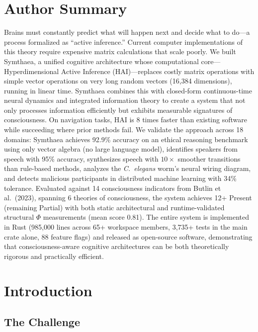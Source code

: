 \documentclass[10pt,letterpaper]{article}
\renewcommand{\Phi}{\varPhi}
\begin{document}
\section*{Author Summary}
Brains must constantly predict what will happen next and decide what to do---a process formalized as ``active inference.'' Current computer implementations of this theory require expensive matrix calculations that scale poorly. We built Symthaea, a unified cognitive architecture whose computational core---Hyperdimensional Active Inference (HAI)---replaces costly matrix operations with simple vector operations on very long random vectors (16,384 dimensions), running in linear time. Symthaea combines this with closed-form continuous-time neural dynamics and integrated information theory to create a system that not only processes information efficiently but exhibits measurable signatures of consciousness. On navigation tasks, HAI is 8 times faster than existing software while succeeding where prior methods fail. We validate the approach across 18 domains: Symthaea achieves 92.9\% accuracy on an ethical reasoning benchmark using only vector algebra (no large language model), identifies speakers from speech with 95\% accuracy, synthesizes speech with $10{\times}$ smoother transitions than rule-based methods, analyzes the \emph{C.~elegans} worm's neural wiring diagram, and detects malicious participants in distributed machine learning with 34\% tolerance. Evaluated against 14 consciousness indicators from Butlin et al.\ (2023), spanning 6 theories of consciousness, the system achieves 12+ Present (remaining Partial) with both static architectural and runtime-validated structural $\Phi$ measurements (mean score 0.81). The entire system is implemented in Rust (985,000 lines across 65+ workspace members, 3,735+ tests in the main crate alone, 88 feature flags) and released as open-source software, demonstrating that consciousness-aware cognitive architectures can be both theoretically rigorous and practically efficient.

\section{Introduction}

\subsection{The Challenge}
\end{document}

